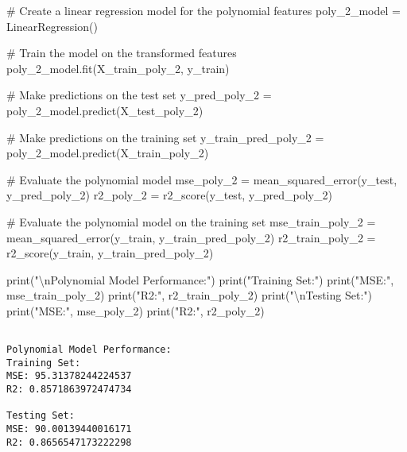 \documentclass[
  letterpaper,
  DIV=11,
  numbers=noendperiod]{scrreprt}
\newenvironment{Shaded}{\begin{snugshade}}{\end{snugshade}}
\newcommand{\BuiltInTok}[1]{\textcolor[rgb]{0.00,0.23,0.31}{#1}}
\newcommand{\CharTok}[1]{\textcolor[rgb]{0.13,0.47,0.30}{#1}}
\newcommand{\CommentTok}[1]{\textcolor[rgb]{0.37,0.37,0.37}{#1}}
\newcommand{\NormalTok}[1]{\textcolor[rgb]{0.00,0.23,0.31}{#1}}
\newcommand{\OperatorTok}[1]{\textcolor[rgb]{0.37,0.37,0.37}{#1}}
\newcommand{\StringTok}[1]{\textcolor[rgb]{0.13,0.47,0.30}{#1}}
\begin{document}
\begin{Shaded}
\begin{Highlighting}[]
\CommentTok{\# Create a linear regression model for the polynomial features}
\NormalTok{poly\_2\_model }\OperatorTok{=}\NormalTok{ LinearRegression()}

\CommentTok{\# Train the model on the transformed features}
\NormalTok{poly\_2\_model.fit(X\_train\_poly\_2, y\_train)}

\CommentTok{\# Make predictions on the test set}
\NormalTok{y\_pred\_poly\_2 }\OperatorTok{=}\NormalTok{ poly\_2\_model.predict(X\_test\_poly\_2)}

\CommentTok{\# Make predictions on the training set}
\NormalTok{y\_train\_pred\_poly\_2 }\OperatorTok{=}\NormalTok{ poly\_2\_model.predict(X\_train\_poly\_2)}

\CommentTok{\# Evaluate the polynomial model}
\NormalTok{mse\_poly\_2 }\OperatorTok{=}\NormalTok{ mean\_squared\_error(y\_test, y\_pred\_poly\_2)}
\NormalTok{r2\_poly\_2 }\OperatorTok{=}\NormalTok{ r2\_score(y\_test, y\_pred\_poly\_2)}

\CommentTok{\# Evaluate the polynomial model on the training set}
\NormalTok{mse\_train\_poly\_2 }\OperatorTok{=}\NormalTok{ mean\_squared\_error(y\_train, y\_train\_pred\_poly\_2)}
\NormalTok{r2\_train\_poly\_2 }\OperatorTok{=}\NormalTok{ r2\_score(y\_train, y\_train\_pred\_poly\_2)}

\BuiltInTok{print}\NormalTok{(}\StringTok{"}\CharTok{\textbackslash{}n}\StringTok{Polynomial Model Performance:"}\NormalTok{)}
\BuiltInTok{print}\NormalTok{(}\StringTok{"Training Set:"}\NormalTok{)}
\BuiltInTok{print}\NormalTok{(}\StringTok{"MSE:"}\NormalTok{, mse\_train\_poly\_2)}
\BuiltInTok{print}\NormalTok{(}\StringTok{"R2:"}\NormalTok{, r2\_train\_poly\_2)}
\BuiltInTok{print}\NormalTok{(}\StringTok{"}\CharTok{\textbackslash{}n}\StringTok{Testing Set:"}\NormalTok{)}
\BuiltInTok{print}\NormalTok{(}\StringTok{"MSE:"}\NormalTok{, mse\_poly\_2)}
\BuiltInTok{print}\NormalTok{(}\StringTok{"R2:"}\NormalTok{, r2\_poly\_2)}
\end{Highlighting}
\end{Shaded}

\begin{verbatim}

Polynomial Model Performance:
Training Set:
MSE: 95.31378244224537
R2: 0.8571863972474734

Testing Set:
MSE: 90.00139440016171
R2: 0.8656547173222298
\end{verbatim}
\end{document}
